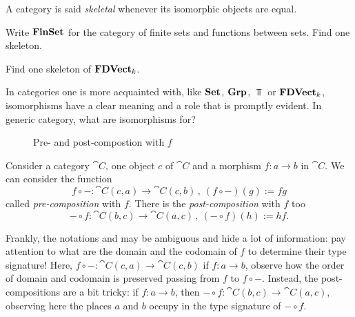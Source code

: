 \begin{definition}
  A category is said {\em skeletal} whenever its isomorphic objects
  are equal.
\end{definition}

\begin{exercise}
  Write \(\mathbf{FinSet}\) for the category of finite sets and functions
  between sets. Find one skeleton.
\end{exercise}

\begin{exercise}
  Find one skeleton of \(\mathbf{FDVect}_k\).
\end{exercise}

 In categories one is
more acquainted with, like \(\mathbf{Set}\), \(\mathbf{Grp}\), \(\Top\) or
\(\mathbf{FDVect}_k\), isomorphisms have a clear meaning and a role that is
promptly evident. In generic category, what are isomorphisms for?

\begin{figure}
  \centering
  \caption{Pre- and post-compostion with \(f\)}
\end{figure}

Consider a  category
\(\cat C\), one object \(c\) of \(\cat C\) and a morphism
\(f : a \to b\) in \(\cat C\). We can consider the function
\[f \circ - : \cat C (c, a) \to \cat C (c, b)\,,\ (f \circ -) (g) := fg\] called
{\em pre-composition} with \(f\). There is the {\em post-composition}
with \(f\) too
\[- \circ f : \cat C (b, c) \to \cat C (a, c)\,,\ (- \circ f) (h) := hf .\]

Frankly, the notations  and  may be
ambiguous and hide a lot of information: pay attention to what are the
domain and the codomain of \(f\) to determine their type signature!
 Here,
\(f \circ - : \cat C (c, a) \to \cat C (c, b)\) if \(f : a \to b\), observe
how the order of domain and codomain is preserved passing from \(f\)
to \(f \circ -\). Instead, the post-compositions are a bit tricky: if
\(f : a \to b\), then \(- \circ f : \cat C (b, c) \to \cat C (a, c)\),
observing here the places \(a\) and \(b\) occupy in the type signature
of \(- \circ f\).


